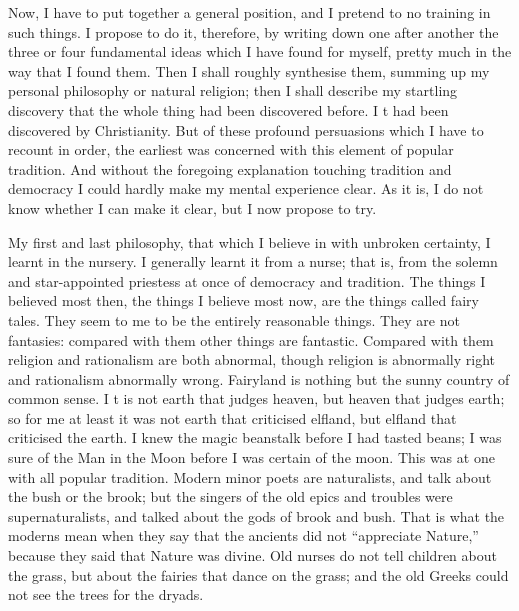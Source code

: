 \documentclass{book}
\begin{document}
Now, I have to put together a general position, and I pretend to no training in such things. I propose to do it, therefore, by writing down one after another the three or four fundamental ideas which I have found for myself, pretty much in the way that I found them. Then I shall roughly synthesise them, summing up my personal philosophy or natural religion; then I shall describe my startling discovery that the whole thing had been discovered before. I t had been discovered by Christianity. But of these profound persuasions which I have to recount in order, the earliest was concerned with this element of popular tradition. And without the foregoing explanation touching tradition and democracy I could hardly make my mental experience clear. As it is, I do not know whether I can make it clear, but I now propose to try.

My first and last philosophy, that which I believe in with unbroken certainty, I learnt in the nursery. I generally learnt it from a nurse; that is, from the solemn and star-appointed priestess at once of democracy and tradition. The things I believed most then, the things I believe most now, are the things called fairy tales. They seem to me to be the entirely reasonable things. They are not fantasies: compared with them other things are fantastic. Compared with them religion and rationalism are both abnormal, though religion is abnormally right and rationalism abnormally wrong. Fairyland is nothing but the sunny country of common sense. I t is not earth that judges heaven, but heaven that judges earth; so for me at least it was not earth that criticised elfland, but elfland that criticised the earth. I knew the magic beanstalk before I had tasted beans; I was sure of the Man in the Moon before I was certain of the moon. This was at one with all popular tradition. Modern minor poets are naturalists, and talk about the bush or the brook; but the singers of the old epics and troubles were supernaturalists, and talked about the gods of brook and bush. That is what the moderns mean when they say that the ancients did not “appreciate Nature,” because they said that Nature was divine. Old nurses do not tell children about the grass, but about the fairies that dance on the grass; and the old Greeks could not see the trees for the dryads.
\end{document}
